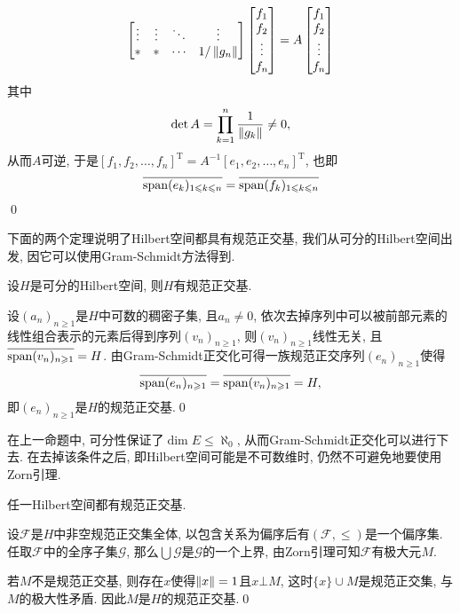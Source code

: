 \begin{Proof}
\[\begin{bmatrix}
    \vdots & \vdots & \ddots & \vdots\\
    \ast & \ast & \cdots & 1/\left\| g_n \right\|
    \end{bmatrix}\begin{bmatrix}
    f_1\\f_2\\\vdots\\f_n
    \end{bmatrix}=A\begin{bmatrix}
    f_1\\f_2\\\vdots\\f_n
    \end{bmatrix}
    \]
    其中
    \[
    \det A=\prod_{k=1}^n\frac{1}{\left\| g_k \right\|}\ne 0,
    \]
    从而$ A $可逆, 于是$ [f_1,f_2, \dots,f_n]^\mathrm T=A^{-1}[e_1,e_2, \dots,e_n]^\mathrm T $, 也即
    \[
    \overline{\operatorname{span}(e_k)_{1\leqslant k\leqslant n}}=\overline{\operatorname{span}(f_k)_{1\leqslant k\leqslant n}}
    \]
    \qed
    \end{Proof}

    下面的两个定理说明了Hilbert空间都具有规范正交基, 我们从可分的Hilbert空间出发, 因它可以使用Gram-Schmidt方法得到.

    \begin{Proposition}
    设$ H $是可分的Hilbert空间, 则$ H $有规范正交基.
    \end{Proposition}
    \begin{Proof}
    设$ (a_n)_{n\geqslant 1} $是$ H $中可数的稠密子集, 且$ a_n\ne 0 $, 依次去掉序列中可以被前部元素的线性组合表示的元素后得到序列$ (v_n)_{n\geqslant 1} $, 则$ (v_n)_{n\geqslant 1} $线性无关, 且$ \overline{\operatorname{span}(v_n)_{n\geqslant 1}}=H $. 由Gram-Schmidt正交化可得一族规范正交序列$ (e_n)_{n\geqslant 1} $使得
    \[
    \overline{\operatorname{span}(e_n)_{n\geqslant 1}}=\overline{\operatorname{span}(v_n)_{n\geqslant 1}}=H,
    \]
    即$ (e_n)_{n\geqslant 1} $是$ H $的规范正交基.\qed
    \end{Proof}
    在上一命题中, 可分性保证了$ \dim E\leqslant\aleph_0 $, 从而Gram-Schmidt正交化可以进行下去. 在去掉该条件之后, 即Hilbert空间可能是不可数维时, 仍然不可避免地要使用Zorn引理.

    \begin{Theorem}
    任一Hilbert空间都有规范正交基.
    \end{Theorem}
    \begin{Proof}
    设$ \mathcal F $是$ H $中非空规范正交集全体, 以包含关系为偏序后有$ (\mathcal F,\leqslant) $是一个偏序集. 任取$ \mathcal F $中的全序子集$ \mathcal G $, 那么$ \bigcup\mathcal G $是$ \mathcal G $的一个上界, 由Zorn引理可知$ \mathcal F $有极大元$ M $.

    若$ M $不是规范正交基, 则存在$ x $使得$ \left\| x \right\|=1 $且$ x\bot M $, 这时$ \{ x \}\cup M $是规范正交集, 与$ M $的极大性矛盾. 因此$ M $是$ H $的规范正交基.\qed
    \end{Proof}

